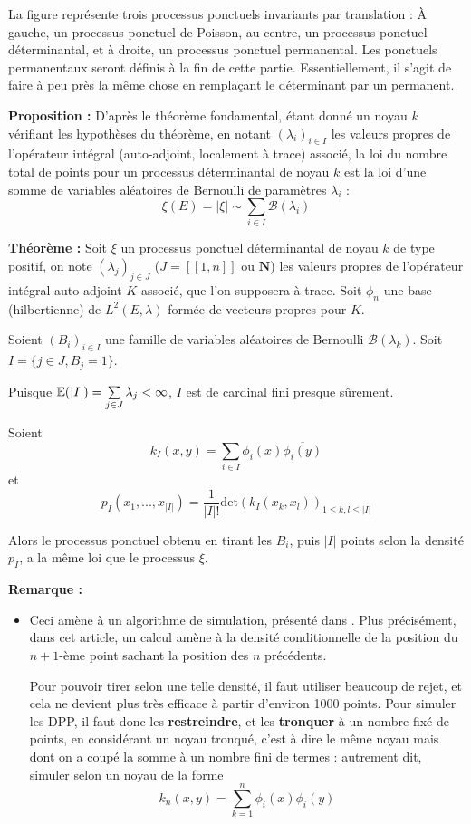 \documentclass[12pt]{article}
\let\oldsum\sum
\renewcommand{\sum}{\oldsum\limits}
\begin{document}
\begin{center}

\end{center}

La figure représente trois processus ponctuels invariants par translation : À gauche, un processus ponctuel de Poisson, au centre, un processus ponctuel déterminantal, et à droite, un processus ponctuel permanental. Les ponctuels permanentaux seront définis à la fin de cette partie. Essentiellement, il s'agit de faire à peu près la même chose en remplaçant le déterminant par un permanent.

\textbf{Proposition :} D'après le théorème fondamental, étant donné un noyau $k$ vérifiant les hypothèses du théorème, en notant $ (\lambda_i)_{i\in I} $ les valeurs propres de l'opérateur intégral (auto-adjoint, localement à trace) associé, la loi du nombre total de points pour un processus déterminantal de noyau $k$ est la loi d'une somme de variables aléatoires de Bernoulli de paramètres $ \lambda_i $ : $$ \xi(E) = |\xi| \sim \sum_{i \in I} \mathcal B(\lambda_i ) $$

\textbf{Théorème :} Soit $\xi$ un processus ponctuel déterminantal de noyau $k$ de type positif, on note $ (\lambda_j)_{j \in J} $ ($J = [\![1,n]\!]$ ou $\mathbf N$) les valeurs propres de l'opérateur intégral auto-adjoint $K$ associé, que l'on supposera à trace. Soit $ \phi_n$ une base (hilbertienne) de $ L^2(E, \lambda)$ formée de vecteurs propres pour $K$. 

Soient $(B_i)_{i \in I} $ une famille de variables aléatoires de Bernoulli $ \mathcal B(\lambda_k) $. Soit $ I = \{ j \in J, B_j = 1 \} $. 

Puisque $ \mathbb E(|I|) = \sum\limits_{j \in J} \lambda_j < \infty $, $I$ est de cardinal fini presque sûrement. 

Soient $$k_I(x,y) = \sum_{i \in I} \phi_i(x) \overline{\phi_i(y)} $$ et $$ p_I(x_1,...,x_{|I|}) = \frac{1}{|I|!} \mathrm{det}(k_I(x_k,x_l))_{1\leqslant k,l \leqslant |I|} $$

Alors le processus ponctuel obtenu en tirant les $B_i$, puis $ |I| $ points selon la densité $ p_I $, a la même loi que le processus $ \xi $.

\textbf{Remarque :}

\begin{itemize}

  \item Ceci amène à un algorithme de simulation, présenté dans \cite{DecreusefondVergne2015}. Plus précisément, dans cet article, un calcul amène à la densité conditionnelle de la position du $ n+1 $-ème point sachant la position des $n$ précédents. 
  
  Pour pouvoir tirer selon une telle densité, il faut utiliser beaucoup de rejet, et cela ne devient plus très efficace à partir d'environ 1000 points. Pour simuler les DPP, il faut donc les \textbf{restreindre}, et les \textbf{tronquer} à un nombre fixé de points, en considérant un noyau tronqué, c'est à dire le même noyau mais dont on a coupé la somme à un nombre fini de termes : autrement dit, simuler selon un noyau de la forme $$ k_n(x,y) = \sum_{k = 1}^n \phi_i(x) \overline{\phi_i(y)} $$

\end{itemize}
\end{document}
